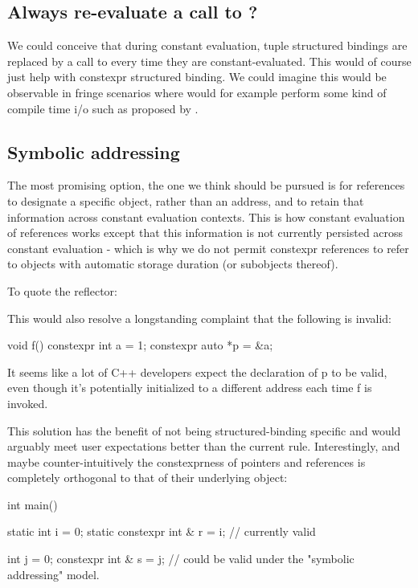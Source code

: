 \documentclass{wg21}
\begin{document}
\subsection{Always re-evaluate a call to ?}

We could conceive that during constant evaluation, tuple structured bindings are replaced by a call to  every time they are constant-evaluated.
This would of course just help with constexpr structured binding. We could imagine this would be observable in fringe scenarios where  would for example
perform some kind of compile time i/o such as proposed by .

\subsection{Symbolic addressing}

The most promising option, the one we think should be pursued is for  references to designate a specific object, rather than an address,
and to retain that information across constant evaluation contexts.
This is how constant evaluation of references works except that this information is not currently persisted across constant evaluation - which is why we do not permit
constexpr references to refer to objects with automatic storage duration (or subobjects thereof).

To quote the reflector:

\begin{quoteblock}
This would also resolve a longstanding complaint that the following is invalid:
\begin{colorblock}
void f() {
    constexpr int a = 1;
    constexpr auto *p = &a;
}
\end{colorblock}

It seems like a lot of C++ developers expect the declaration of p to be valid, even though it's potentially initialized to a different address each time f is invoked.
\end{quoteblock}

This solution has the benefit of not being structured-binding specific and would arguably meet user expectations better than the current rule.
Interestingly, and maybe counter-intuitively  the constexprness of pointers and references is completely orthogonal to that of their underlying object:

\begin{colorblock}
int main() {
    static int i = 0;
    static constexpr int & r = i; // currently valid

    int j = 0;
    constexpr int & s = j; // could be valid under the "symbolic addressing" model.
}
\end{colorblock}
\end{document}
